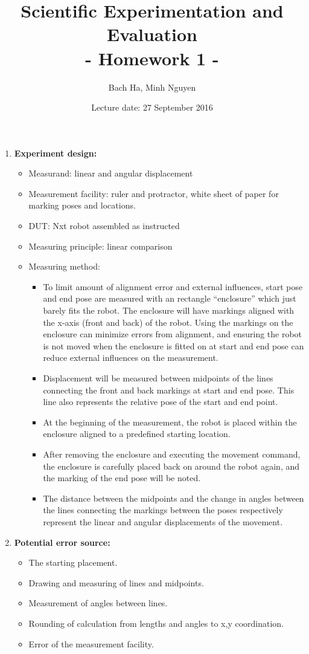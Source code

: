 \documentclass[a4paper, 12pt]{article}
\title{Scientific Experimentation and Evaluation \\
				- Homework 1 -}
\author{Bach Ha, Minh Nguyen}
\date{Lecture date: 27 September 2016}
\begin{document}
\maketitle


\begin{enumerate}
    \item \textbf{Experiment design:}
    \begin{itemize}
        \item Measurand: linear and angular displacement
        \item Measurement facility: ruler and protractor, white sheet of paper for marking poses and locations.
        \item DUT: Nxt robot assembled as instructed
        \item Measuring principle: linear comparison
        \item Measuring method:
            \begin{itemize}
                \item To limit amount of alignment error and external influences, start pose and end pose are measured with an rectangle ``enclosure'' which just barely fits the robot. The enclosure will have markings aligned with the x-axis (front and back) of the robot. Using the markings on the enclosure can minimize errors from alignment, and ensuring the robot is not moved when the enclosure is fitted on at start and end pose can reduce external influences on the measurement.
                \item Displacement will be measured between midpoints of the lines connecting the front and back markings at start and end pose. This line also represents the relative pose of the start and end point.
                \item At the beginning of the measurement, the robot is placed within the enclosure aligned to a predefined starting location.
                \item After removing the enclosure and executing the movement command, the enclosure is carefully placed back on around the robot again, and the marking of the end pose will be noted.
                \item The distance between the midpoints and the change in angles between the lines connecting the markings between the poses respectively represent the linear and angular displacements of the movement.
            \end{itemize}
    \end{itemize}

    \item \textbf{Potential error source:}
    \begin{itemize}
        \item The starting placement.
        \item Drawing and measuring of lines and midpoints.
        \item Measurement of angles between lines.
        \item Rounding of calculation from lengths and angles to x,y coordination.
        \item Error of the measurement facility.
    \end{itemize}

\end{enumerate}
\end{document}
